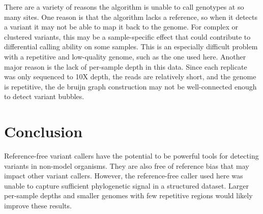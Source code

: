 There are a variety of reasons the algorithm is unable to call genotypes at so many sites. One reason is that the algorithm lacks a reference, so when it detects a variant it may not be able to map it back to the genome. For complex or clustered variants, this may be a sample-specific effect that could contribute to differential calling ability on some samples. This is an especially difficult problem with a repetitive and low-quality genome, such as the one used here. Another major reason is the lack of per-sample depth in this data. Since each replicate was only sequenced to 10X depth, the reads are relatively short, and the genome is repetitive, the de bruijn graph construction may not be well-connected enough to detect variant bubbles.

\section{Conclusion}

Reference-free variant callers have the potential to be powerful tools for detecting variants in non-model organisms. They are also free of reference bias that may impact other variant callers. However, the reference-free caller used here was unable to capture sufficient phylogenetic signal in a structured dataset. Larger per-sample depths and smaller genomes with few repetitive regions would likely improve these results.

\printbibliography[segment=\therefsegment]{}
